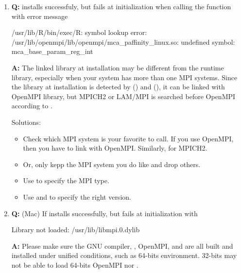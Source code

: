 \begin{enumerate}
\item {\bf\color{blue} Q:}
       installs successfuly, but fails at initialization when
      calling the function  with error message
\begin{Error}
/usr/lib/R/bin/exec/R: symbol lookup error:
/usr/lib/openmpi/lib/openmpi/mca_paffinity_linux.so: undefined symbol:
mca_base_param_reg_int
\end{Error}
      {\bf\color{blue} A:}
      The linked library at installation may be different from the runtime
      library, especially when your system has more than one MPI systems.
      Since the library at installation is detected by
       () and  (),
      it can be linked with OpenMPI library, but MPICH2 or LAM/MPI is searched
      before OpenMPI according to .

      Solutions:
      \begin{itemize}
      \item Check which MPI system is your favorite to call. If you use
            OpenMPI, then you have to link with OpenMPI. Similarly, for
            MPICH2.
      \item Or, only kepp the MPI system you do like and drop others.
      \item Use \code{-} to specify the MPI type.
      \item Use \code{-} and
            \code{-} to
            specify the right version.
      \end{itemize}

\item {\bf\color{blue} Q:}
      (Mac) If installs successfully, but fails at initialization with
\begin{Error}
Library not loaded: /usr/lib/libmpi.0.dylib
\end{Error}
      {\bf\color{blue} A:}
      Please make sure the GNU compiler, , OpenMPI, and
       are all built and installed under unified conditions,
      such as 64-bits environment. 32-bits  may not be able to
      load 64-bits OpenMPI nor .


\end{enumerate}
